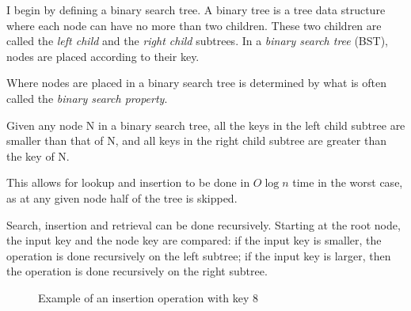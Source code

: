 I begin by defining a binary search tree. A binary tree is a tree data structure where each node can have no more than two children. These two children are 
called the \textit{left child} and the \textit{right child} subtrees. In a \textit{binary search tree} (BST), nodes are placed according to their key. 

Where nodes are placed in a binary search tree is determined by what is often called the \textit{binary search property}.

\begin{definition}
  \label{def:bst_property}
  Given any node N in a binary search tree, all the keys in the left child subtree are smaller than that of N, and all keys in the right child subtree are greater than the 
  key of N.
\end{definition}

This allows for lookup and insertion to be done in $O \log n$ time in the worst case, as at any given node half of the tree is skipped.

Search, insertion and retrieval can be done recursively. Starting at the root node, the input key and the node key are compared: if the input key is smaller,
the operation is done recursively on the left subtree; if the input key is larger, then the operation is done recursively on the right subtree.

\begin{figure}[!ht]
  \centering
  \hspace{1cm}%
    \hspace{1cm}%
    \caption{Example of an insertion operation with key 8}
    \label{fig:insert}
\end{figure}

